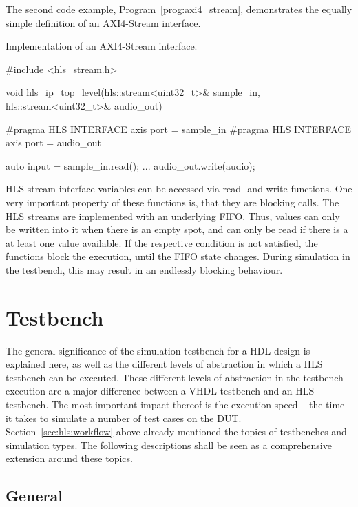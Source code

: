 The second code example, Program~\ref{prog:axi4_stream}, demonstrates the equally simple definition of an AXI4-Stream interface.

\begin{program}
  \caption{Implementation of an AXI4-Stream interface.}
  \label{prog:axi4_stream}
\begin{CppCode}
 #include <hls_stream.h>

 void hls_ip_top_level(hls::stream<uint32_t>& sample_in,
                       hls::stream<uint32_t>& audio_out) {
     #pragma HLS INTERFACE axis port = sample_in
     #pragma HLS INTERFACE axis port = audio_out

     auto input = sample_in.read();
     ...
     audio_out.write(audio);
 }
\end{CppCode}
\end{program}

HLS stream interface variables can be accessed via read- and write-functions.
One very important property of these functions is, that they are blocking calls.
The HLS streams are implemented with an underlying FIFO.
Thus, values can only be written into it when there is an empty spot, and can only be read if there is a at least one value available.
If the respective condition is not satisfied, the functions block the execution, until the FIFO state changes.
During simulation in the testbench, this may result in an endlessly blocking behaviour.

\section{Testbench}

The general significance of the simulation testbench for a HDL design is explained here, as well as the different levels of abstraction in which a HLS testbench can be executed.
These different levels of abstraction in the testbench execution are a major difference between a VHDL testbench and an HLS testbench.
The most important impact thereof is the execution speed -- the time it takes to simulate a number of test cases on the DUT.\\

Section~\ref{sec:hls:workflow} above already mentioned the topics of testbenches and simulation types.
The following descriptions shall be seen as a comprehensive extension around these topics.

\subsection{General}
\label{sub:hls:testbench:general}

